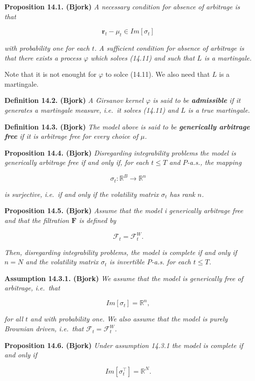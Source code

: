 \documentclass[a4paper,10pt,openany]{book}
\begin{document}
\textbf{Proposition 14.1. (Bjork)} \emph{A necessary condition for absence of arbitrage is that}

\[
\mathbf{r}_t-\mu_t\in Im[\sigma_t]
\]

\emph{with probability one for each \(t\). A sufficient condition for absence of arbitrage is that there exists a process \(\varphi\) which solves (14.11) and such that \(L\) is a martingale.}

Note that it is not enought for \(\varphi\) to solce (14.11). We also need that \(L\) is a martingale.

\textbf{Definition 14.2. (Bjork)} \emph{A Girsanov kernel \(\varphi\) is said to be \textbf{admissible} if it generates a martingale measure, i.e.~it solves (14.11) and \(L\) is a true martingale.}

\textbf{Definition 14.3. (Bjork)} \emph{The model above is said to be \textbf{generically arbitrage free} if it is arbitrage free for every choice of \(\mu\).}

\textbf{Proposition 14.4. (Bjork)} \emph{Disregarding integrability problems the model is generically arbitrage free if and only if, for each \(t\le T\) and \(P\)-a.s., the mapping}

\[
\sigma_t : \mathbb{R}^B\to \mathbb{R}^n
\]

\emph{is surjective, i.e.~if and only if the volatility matrix \(\sigma_t\) has rank \(n\).}

\textbf{Proposition 14.5. (Bjork)} \emph{Assume that the model i generically arbitrage free and that the filtration \(\mathbf{F}\) is defined by}

\[
\mathcal{F}_t=\mathcal{F}^W_t.\tag{14.14}
\]

\emph{Then, disregarding integrability problems, the model is complete if and only if \(n=N\) and the volatility matrix \(\sigma_t\) is invertible \(P\)-a.s. for each \(t\le T\).}

\textbf{Assumption 14.3.1. (Bjork)} \emph{We assume that the model is generically free of arbitrage, i.e.~that}

\[
Im[\sigma_t]=\mathbb{R}^n,\tag{14.16}
\]

\emph{for all \(t\) and with probability one. We also assume that the model is purely Brownian driven, i.e.~that \(\mathcal{F}_t=\mathcal{F}_t^W\).}

\textbf{Proposition 14.6. (Bjork)} \emph{Under assumption 14.3.1 the model is complete if and only if}

\[
Im[\sigma_t^\top]=\mathbb{R}^N.\tag{14.23}
\]
\end{document}
